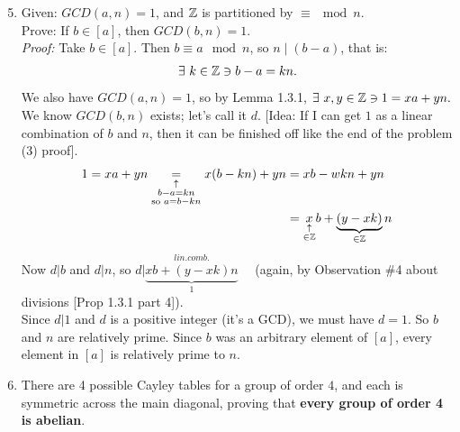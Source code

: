 \begin{enumerate}
    \setcounter{enumi}{4} %

    \item Given: $GCD(a, n) = 1$, and ${\mathbb{ Z}}$ is partitioned by $\equiv \mod n$.  \\
          Prove: If $b \in [a]$, then $GCD(b, n) = 1$. \\

          \textit{Proof:}  
          Take $b \in [a]$. Then $b \equiv a \mod{n}$, so $n \mid (b - a)$, that is:
          \[
          \exists \ k \in {\mathbb{ Z}} \ni b - a = kn.
          \]
          We also have $GCD(a, n) = 1$, so by Lemma 1.3.1, $\exists \ x, y \in {\mathbb{ Z}} \ni 1 = xa + yn.$ \\
          We know $GCD(b, n)$ exists; let's call it $d$. [Idea: If I can get $1$ as a linear combination of $b$ and $n$, then it can be finished off like the end of the problem (3) proof]. 
          \begin{align*}
            1 = xa+yn \underset{\substack{\uparrow \\ b-a=kn \\ \text{so }a=b-kn}}{=} x(b-kn)+yn &= xb-wkn+yn \\
            &= \underset{\substack{\uparrow \\ \in {\mathbb{ Z}}}}{x}b+ \underbrace{(y-xk)}_{\in {\mathbb{ Z}}}n
          \end{align*}
          Now $d|b$ and $d|n$, so $d| \underbrace{\overset{\substack{lin. comb.}}{xb+(y-xk)n}}_{1}$ \ \ (again, by Observation \#4 about divisions [Prop 1.3.1 part 4]). \\
          Since $d|1$ and $d$ is a positive integer (it's a GCD), we must have $d = 1$. So $b$ and $n$ are relatively prime. Since $b$ was an arbitrary element of $[a]$, every element in $[a]$ is relatively prime to $n$.

    \item There are 4 possible Cayley tables for a group of order $4$, and each is symmetric across the main diagonal, proving that \textbf{every group of order 4 is abelian}.


\end{enumerate}
